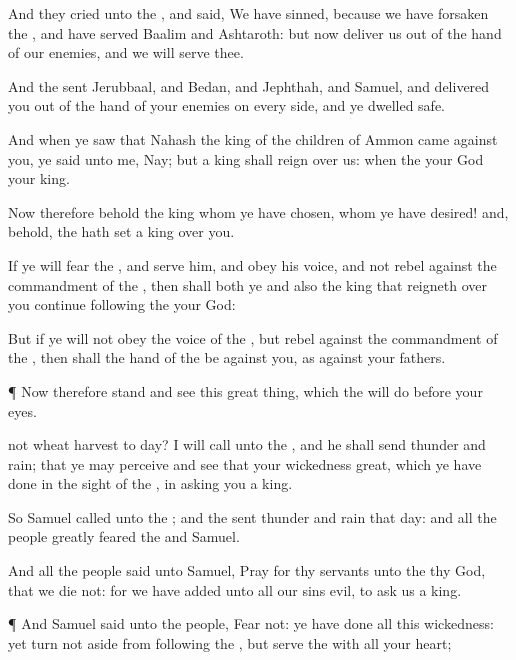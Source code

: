 {And they
cried unto the
{}, and
said, We have
sinned, because we have
forsaken the
{}, and have
served
Baalim and
Ashtaroth: but now
deliver us out of the
hand of our
enemies, and we will
serve thee.

And the
{}
sent
Jerubbaal, and
Bedan, and
Jephthah, and
Samuel, and
delivered you out of the
hand of your
enemies on every
side, and ye
dwelled
safe.

And when ye
saw that
Nahash the
king of the
children of
Ammon
came against you, ye
said unto me, Nay; but a
king shall
reign over us: when the
{} your
God
{} your
king.

Now therefore behold the
king whom ye have
chosen,
{} whom ye have
desired! and, behold, the
{} hath
set a
king over you.

If ye will
fear the
{}, and
serve him, and
obey his
voice, and not
rebel against the
commandment of the
{}, then shall both ye and also the
king that
reigneth over you continue
following the
{} your
God:

But if ye will not
obey the
voice of the
{}, but
rebel against the
commandment of the
{}, then shall the
hand of the
{} be against you, as
{} against your
fathers.


\par }{\PP {}¶ Now
therefore
stand and
see this
great
thing, which the
{} will
do before your
eyes.

 not
wheat
harvest to
day? I will
call unto the
{}, and he shall
send
thunder and
rain; that ye may
perceive and
see that your
wickedness
{}
great, which ye have
done in the
sight of the
{}, in
asking you a
king.

So
Samuel
called unto the
{}; and the
{}
sent
thunder and
rain that
day: and all the
people
greatly
feared the
{} and
Samuel.

And all the
people
said unto
Samuel,
Pray for thy
servants unto the
{} thy
God, that we
die not: for we have
added unto all our
sins
{}
evil, to
ask us a
king.


\par }{\PP {}¶ And
Samuel
said unto the
people,
Fear not: ye have
done all this
wickedness: yet turn not
aside from
following the
{}, but
serve the
{} with all your
heart;

}
